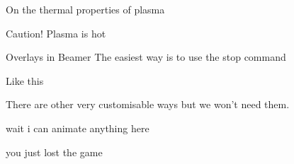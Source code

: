 \documentclass[10pt]{beamer}
\begin{document}
\begin{frame}{On the thermal properties of plasma}
    \begin{block}{Caution!}
        Plasma is hot
    \end{block}
\end{frame}

\begin{frame}{Overlays in Beamer}
    The easiest way is to use the stop command
    \pause

    Like this
    \pause

    There are other very customisable ways but we won't need them.
    \pause

    wait i can animate anything here
    \pause

    you just lost the game
\end{frame}
\end{document}
